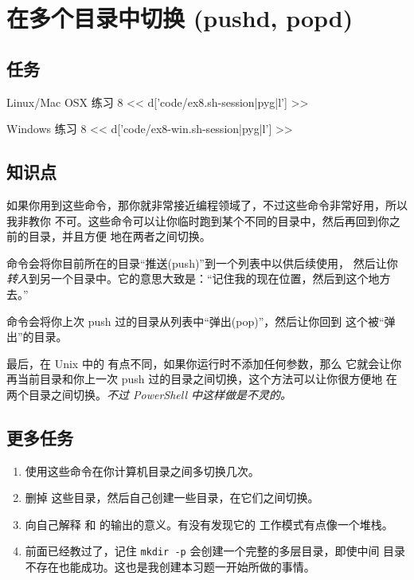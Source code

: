 \chapter{在多个目录中切换 (pushd, popd)}

\section{任务}

\begin{code}{Linux/Mac OSX 练习 8}
<< d['code/ex8.sh-session|pyg|l'] >>
\end{code}

\begin{code}{Windows 练习 8}
<< d['code/ex8-win.sh-session|pyg|l'] >>
\end{code}

\section{知识点}

如果你用到这些命令，那你就非常接近编程领域了，不过这些命令非常好用，所以我非教你
不可。这些命令可以让你临时跑到某个不同的目录中，然后再回到你之前的目录，并且方便
地在两者之间切换。

 命令会将你目前所在的目录“推送(push)”到一个列表中以供后续使用，
然后让你\emph{转入}到另一个目录中。它的意思大致是：“记住我的现在位置，然后到这个地方去。”

 命令会将你上次 push 过的目录从列表中“弹出(pop)”，然后让你回到
这个被“弹出”的目录。

最后，在 Unix 中的  有点不同，如果你运行时不添加任何参数，那么
它就会让你再当前目录和你上一次 push 过的目录之间切换，这个方法可以让你很方便地
在两个目录之间切换。\emph{不过 PowerShell 中这样做是不灵的。}


\section{更多任务}

\begin{enumerate}
\item 使用这些命令在你计算机目录之间多切换几次。
\item 删掉  这些目录，然后自己创建一些目录，在它们之间切换。
\item 向自己解释  和  的输出的意义。有没有发现它的
    工作模式有点像一个堆栈。
\item 前面已经教过了，记住 \verb|mkdir -p| 会创建一个完整的多层目录，即使中间
    目录不存在也能成功。这也是我创建本习题一开始所做的事情。
\end{enumerate}


